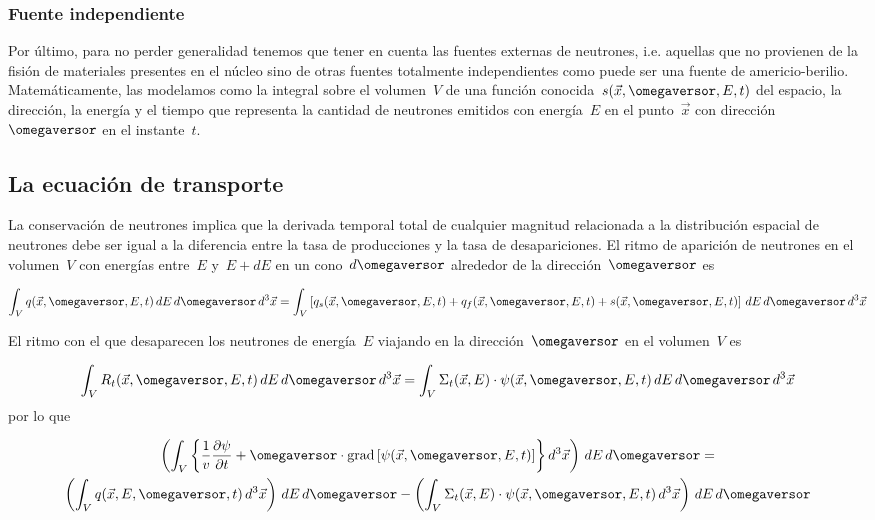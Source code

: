 \subsubsection{Fuente independiente} %

Por último, para no perder generalidad tenemos que tener en cuenta las fuentes externas de neutrones, i.e. aquellas que no provienen de la fisión de materiales presentes en el núcleo sino de otras fuentes totalmente independientes como puede ser una fuente de americio-berilio. Matemáticamente, las modelamos como la integral sobre el volumen~$V$ de una función conocida~$s(\vec{x}, \omegaversor, E, t)$ del espacio, la dirección, la energía y el tiempo que representa la cantidad de neutrones emitidos con energía~$E$ en el punto~$\vec{x}$ con dirección~$\omegaversor$ en el instante~$t$.

\subsection{La ecuación de transporte} %

La conservación de neutrones implica que la derivada temporal total de cualquier magnitud relacionada a la distribución espacial de neutrones debe ser igual a la diferencia entre la tasa de producciones y la tasa de desapariciones. El ritmo de aparición de neutrones en el volumen~$V$ con energías entre~$E$ y~$E+dE$ en un cono~$d\omegaversor$ alrededor de la dirección~$\omegaversor$ es

\begin{equation*}
\int_V
 q(\vec{x}, \omegaversor, E, t)  \, dE \, d\omegaversor
\, d^3\vec{x}
 =
\int_V
 \left [q_s(\vec{x}, \omegaversor, E, t) + q_f(\vec{x}, \omegaversor, E, t) + s(\vec{x}, \omegaversor, E, t) \right]  \, dE \, d\omegaversor
\, d^3\vec{x}
\end{equation*}

El ritmo con el que desaparecen los neutrones de energía~$E$ viajando en la dirección~$\omegaversor$ en el volumen~$V$ es

\begin{equation*}
\int_V
R_t(\vec{x}, \omegaversor, E, t)  \, dE \, d\omegaversor
\, d^3\vec{x}
 =
\int_V
\Sigma_t(\vec{x}, E) \cdot \psi(\vec{x}, \omegaversor, E, t) \, dE \, d\omegaversor
\, d^3\vec{x}
\end{equation*}
%
por lo que

\begin{multline}
\left( \int_{V} \left\{ \frac{1}{v} \frac{\partial \psi}{\partial t} + \omegaversor \cdot \text{grad} \left[ \psi(\vec{x}, \omegaversor, E, t) \right] \right\}  d^3\vec{x} \right) \, dE \, d\omegaversor = \\
\left( \int_{V} q(\vec{x}, E, \omegaversor, t) \, d^3\vec{x} \right) \, dE \, d\omegaversor -
\left( \int_{V} \Sigma_t(\vec{x}, E) \cdot \psi(\vec{x}, \omegaversor, E, t) \, d^3\vec{x} \right) \, dE \, d\omegaversor
\end{multline}


